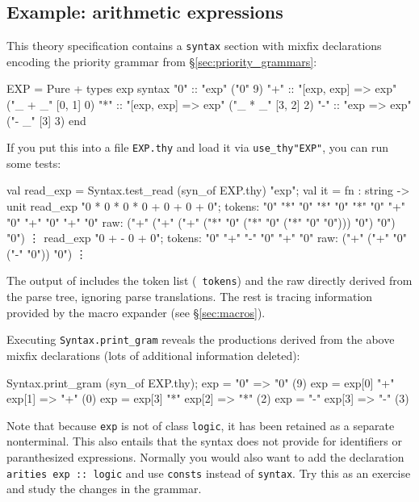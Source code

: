 \subsection{Example: arithmetic expressions}
This theory specification contains a {\tt syntax} section with mixfix
declarations encoding the priority grammar from
\S\ref{sec:priority_grammars}:
\begin{ttbox}
EXP = Pure +
types
  exp
syntax
  "0" :: "exp"                ("0"      9)
  "+" :: "[exp, exp] => exp"  ("_ + _"  [0, 1] 0)
  "*" :: "[exp, exp] => exp"  ("_ * _"  [3, 2] 2)
  "-" :: "exp => exp"         ("- _"    [3] 3)
end
\end{ttbox}
If you put this into a file {\tt EXP.thy} and load it via {\tt use_thy"EXP"},
you can run some tests:
\begin{ttbox}
val read_exp = Syntax.test_read (syn_of EXP.thy) "exp";
{\out val it = fn : string -> unit}
read_exp "0 * 0 * 0 * 0 + 0 + 0 + 0";
{\out tokens: "0" "*" "0" "*" "0" "*" "0" "+" "0" "+" "0" "+" "0"}
{\out raw: ("+" ("+" ("+" ("*" "0" ("*" "0" ("*" "0" "0"))) "0") "0") "0")}
{\out \vdots}
read_exp "0 + - 0 + 0";
{\out tokens: "0" "+" "-" "0" "+" "0"}
{\out raw: ("+" ("+" "0" ("-" "0")) "0")}
{\out \vdots}
\end{ttbox}
The output of  includes the token list ({\tt
  tokens}) and the raw \AST{} directly derived from the parse tree,
ignoring parse \AST{} translations.  The rest is tracing information
provided by the macro expander (see \S\ref{sec:macros}).

Executing {\tt Syntax.print_gram} reveals the productions derived from the
above mixfix declarations (lots of additional information deleted):
\begin{ttbox}
Syntax.print_gram (syn_of EXP.thy);
{\out exp = "0"  => "0" (9)}
{\out exp = exp[0] "+" exp[1]  => "+" (0)}
{\out exp = exp[3] "*" exp[2]  => "*" (2)}
{\out exp = "-" exp[3]  => "-" (3)}
\end{ttbox}

Note that because {\tt exp} is not of class {\tt logic}, it has been retained
as a separate nonterminal. This also entails that the syntax does not provide
for identifiers or paranthesized expressions. Normally you would also want to
add the declaration {\tt arities exp :: logic} and use {\tt consts} instead
of {\tt syntax}. Try this as an exercise and study the changes in the
grammar.

